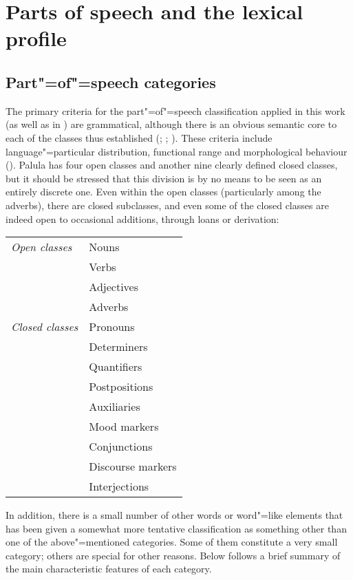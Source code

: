 \chapter{Parts of speech and the lexical profile}
\label{chap:3b}
\section{Part"=of"=speech categories}
\label{sec:3b-1}


The primary criteria for the part"=of"=speech classification applied in this work (as well as in \citealt{liljegrenhaider2011}) are grammatical, although there is an obvious semantic core to each of the classes thus established (\citealt[49-54]{givon2001a}; \citealt[47-54, 102-106]{dixon2010}; \citealt[183-188]{croft2003}). These criteria include language"=particular distribution, functional range and morphological behaviour (\citealt[1-3]{schachtershopen2007}). Palula has four open classes and another nine clearly defined closed classes, but it should be stressed that this division is by no means to be seen as an entirely discrete one. Even within the open classes (particularly among the adverbs), there are closed subclasses, and even some of the closed classes are indeed open to occasional additions, through loans or derivation:


\begin{table}[H]
\begin{tabularx}{\textwidth}{ l@{\hspace{30pt}} Q }
\textit{Open classes} &
Nouns\\
&
Verbs\\
&
Adjectives\\
&
Adverbs\\
\textit{Closed classes} &
Pronouns\\
&
Determiners\\
&
Quantifiers\\
&
Postpositions\\
&
Auxiliaries\\
&
Mood markers\\
&
Conjunctions\\
&
Discourse markers\\
&
Interjections\\
\end{tabularx}
\end{table}


In addition, there is a small number of other words or word"=like elements that has been given a somewhat more tentative classification as something other than one of the above"=mentioned categories. Some of them constitute a very small category; others are special for other reasons. Below follows a brief summary of the main characteristic features of each category.


